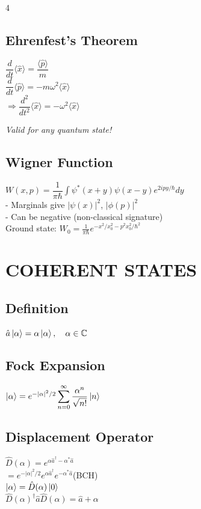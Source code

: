 \documentclass[10pt,landscape,a4paper]{article}
\newcommand{\aop}{\hat{a}}
\newcommand{\adop}{\hat{a}^{\dagger}}
\newcommand{\xop}{\hat{x}}
\newcommand{\pop}{\hat{p}}
\newcommand{\Dop}[1]{\hat{D}(#1)}
\newcommand{\xzero}{x_0}
\begin{document}
\begin{multicols}{4}
\subsection{Ehrenfest's Theorem}
\begin{keybox}
$\dfrac{d}{dt}\langle\xop\rangle = \dfrac{\langle\pop\rangle}{m}$\\[4pt]
$\dfrac{d}{dt}\langle\pop\rangle = -m\omega^2\langle\xop\rangle$\\[4pt]
$\Rightarrow\dfrac{d^2}{dt^2}\langle\xop\rangle = -\omega^2\langle\xop\rangle$
\end{keybox}
\textit{Valid for any quantum state!}

\subsection{Wigner Function}
$W(x,p) = \dfrac{1}{\pi\hbar}\!\int\!\psi^*(x{+}y)\psi(x{-}y)e^{2ipy/\hbar}dy$\\[2pt]
- Marginals give $|\psi(x)|^2$, $|\phi(p)|^2$\\
- Can be negative (non-classical signature)\\
Ground state: $W_0 = \frac{1}{\pi\hbar}e^{-x^2/\xzero^2-p^2\xzero^2/\hbar^2}$

\section{COHERENT STATES}

\subsection{Definition}
\begin{coherentbox}
$\aop\ket{\alpha} = \alpha\ket{\alpha},\quad\alpha\in\mathbb{C}$
\end{coherentbox}

\subsection{Fock Expansion}
\begin{coherentbox}
$\ket{\alpha} = e^{-|\alpha|^2/2}\displaystyle\sum_{n=0}^{\infty}\dfrac{\alpha^n}{\sqrt{n!}}\ket{n}$
\end{coherentbox}

\subsection{Displacement Operator}
$\Dop{\alpha} = e^{\alpha\adop - \alpha^*\aop}$\\[2pt]
$= e^{-|\alpha|^2/2}e^{\alpha\adop}e^{-\alpha^*\aop}$\quad (BCH)\\[2pt]
$\ket{\alpha} = \Dop{\alpha}\ket{0}$\\[2pt]
$\Dop{\alpha}^\dagger\aop\Dop{\alpha} = \aop + \alpha$


\end{multicols}
\end{document}
